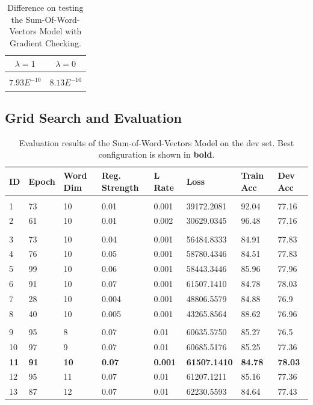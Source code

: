 \documentclass{article} %
\begin{document}
\begin{table}[!htp]
\caption{Difference on testing the Sum-Of-Word-Vectors Model with Gradient Checking.}
\label{table:sumOfWords}
\begin{center}
\begin{tabular}{c c}
\textbf{$\lambda=1$} & \textbf{$\lambda=0$}\\
\hline \\
$7.93E^{-10}$ & $8.13E^{-10}$ \\
\end{tabular}
\end{center}
\end{table}

\subsection{Grid Search and Evaluation}

\begin{table}[!htbp]
\caption{Evaluation results of the Sum-of-Word-Vectors Model on the dev set. Best configuration is shown in {\bf bold}.}
\label{table:GridSearchSWVM}
\begin{center}
\begin{tabular}{ P{1cm} P{1cm} P{1cm} P{2cm} P{1cm} P{2cm} P{1cm} P{1cm} }
\textbf{ID} & \textbf{Epoch} & \textbf{Word Dim} & \textbf{Reg. Strength} & \textbf{L Rate} & \textbf{Loss} & \textbf{Train Acc} & \textbf{Dev Acc}\\
\hline\\

1 & 73 & 10 & 0.01 & 0.001 & 39172.2081 & 92.04 & 77.16\\
2 & 61 & 10 & 0.01 & 0.002 & 30629.0345 & 96.48 & 77.16\\
\\

3 & 73 & 10 & 0.04 & 0.001 & 56484.8333 & 84.91 & 77.83\\
4 & 76 & 10 & 0.05 & 0.001 & 58780.4346 & 84.51 & 77.83\\
5 & 99 & 10 & 0.06 & 0.001 & 58443.3446 & 85.96 & 77.96\\
6 & 91 & 10 & 0.07 & 0.001 & 61507.1410 & 84.78 & 78.03\\
7 & 28 & 10 & 0.004 & 0.001 & 48806.5579 & 84.88 & 76.9\\
8 & 40 & 10 & 0.005 & 0.001 & 43265.8564 & 88.62 & 76.96\\
\\

9 & 95 & 8 & 0.07 & 0.01 & 60635.5750 & 85.27 & 76.5\\
10 & 97 & 9 & 0.07 & 0.01 & 60685.5176 & 85.25 & 77.36\\

\textbf{11} & \textbf{91} & \textbf{10} & \textbf{0.07} & \textbf{0.001} & \textbf{61507.1410} & \textbf{84.78} & \textbf{78.03}\\

12 & 95 & 11 & 0.07 & 0.01 & 61207.1211 & 85.16 & 77.36\\
13 & 87 & 12 & 0.07 & 0.01 & 62230.5593 & 84.64 & 77.43\\
\end{tabular}
\end{center}
\end{table}
\end{document}
